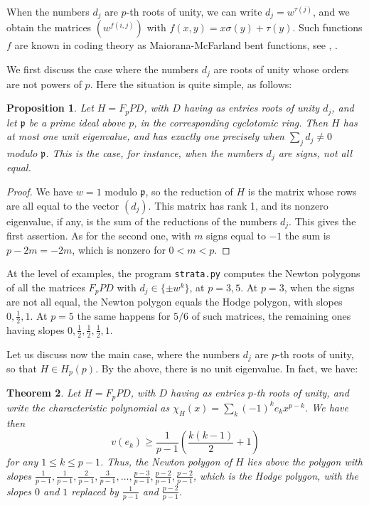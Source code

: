 \documentclass[11pt]{amsart}
\newtheorem{theorem}{Theorem}[section]
\newtheorem{proposition}[theorem]{Proposition}
\theoremstyle{definition}
\begin{document}
When the numbers $d_j$ are $p$-th roots of unity, we can write $d_j=w^{\tau(j)}$, and we obtain the matrices $(w^{f(i,j)})$ with $f(x,y)=x\sigma(y)+\tau(y)$. Such functions $f$ are known in coding theory as Maiorana-McFarland bent functions, see \cite{ksw}, \cite{mcf}.

We first discuss the case where the numbers $d_j$ are roots of unity whose orders are not powers of $p$. Here the situation is quite simple, as follows:

\begin{proposition}\label{punit}
Let $H=F_pPD$, with $D$ having as entries roots of unity $d_j$, and let $\mathfrak p$ be a prime ideal above $p$, in the corresponding cyclotomic ring. Then $H$ has at most one unit eigenvalue, and has exactly one precisely when $\sum_jd_j\neq0$ modulo $\mathfrak p$. This is the case, for instance, when the numbers $d_j$ are signs, not all equal.
\end{proposition}

\begin{proof}
We have $w=1$ modulo $\mathfrak p$, so the reduction of $H$ is the matrix whose rows are all equal to the vector $(d_j)$. This matrix has rank 1, and its nonzero eigenvalue, if any, is the sum of the reductions of the numbers $d_j$. This gives the first assertion. As for the second one, with $m$ signs equal to $-1$ the sum is $p-2m=-2m$, which is nonzero for $0<m<p$.
\end{proof}

At the level of examples, the program \texttt{strata.py} computes the Newton polygons of all the matrices $F_pPD$ with $d_j\in\{\pm w^k\}$, at $p=3,5$. At $p=3$, when the signs are not all equal, the Newton polygon equals the Hodge polygon, with slopes $0,\frac{1}{2},1$. At $p=5$ the same happens for $5/6$ of such matrices, the remaining ones having slopes $0,\frac{1}{2},\frac{1}{2},\frac{1}{2},1$.

\medskip

Let us discuss now the main case, where the numbers $d_j$ are $p$-th roots of unity, so that $H\in H_p(p)$. By the above, there is no unit eigenvalue. In fact, we have:

\begin{theorem}\label{tlow}
Let $H=F_pPD$, with $D$ having as entries $p$-th roots of unity, and write the characteristic polynomial as $\chi_H(x)=\sum_k(-1)^ke_kx^{p-k}$. We have then
$$v(e_k)\geq\frac{1}{p-1}\left(\frac{k(k-1)}{2}+1\right)$$
for any $1\leq k\leq p-1$. Thus, the Newton polygon of $H$ lies above the polygon with slopes $\frac{1}{p-1},\frac{1}{p-1},\frac{2}{p-1},\frac{3}{p-1},\ldots,\frac{p-3}{p-1},\frac{p-2}{p-1},\frac{p-2}{p-1}$, which is the Hodge polygon, with the slopes $0$ and $1$ replaced by $\frac{1}{p-1}$ and $\frac{p-2}{p-1}$.
\end{theorem}
\end{document}

